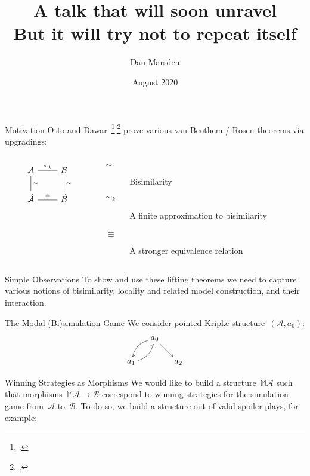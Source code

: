 \documentclass{beamer}
\title{A talk that will soon unravel\\{\small But it will try not to repeat itself}}
\author{Dan Marsden}
\date{August 2020}
\newcommand{\As}{\mathcal{A}}
\newcommand{\Bs}{\mathcal{B}}
\newcommand{\M}{\mathbb{M}}
\begin{document}
\begin{frame}
\maketitle
\end{frame}

\begin{frame}[fragile]{Motivation}
    Otto and Dawar~\footcite{Otto2004},\footcite{DawarOtto2009} prove various van Benthem / Rosen theorems via upgradings:
    \begin{columns}
    \begin{column}{0.3\textwidth}
    \begin{equation*}
    \begin{tikzcd}[arrows=-]
    \As \rar["\sim_k"] \dar["\sim"] & \Bs \dar["\sim"] \\
    \hat{\As} \rar["\dot{\equiv}"] & \hat{\Bs}
    \end{tikzcd}
    \end{equation*}
    \end{column}
    \begin{column}{0.7\textwidth}
    \begin{description}
    \item[$\sim$] Bisimilarity
    \item[$\sim_k$] A finite approximation to bisimilarity
    \item[$\dot{\equiv}$] A stronger equivalence relation
    \end{description}
    \end{column}
    \end{columns}
    \begin{block}{Simple Observations}
    To show and use these lifting theorems we need to capture various notions of bisimilarity, locality and related model construction, and their interaction.
    \end{block}
\end{frame}

\begin{frame}{The Modal (Bi)simulation Game}
    We consider pointed Kripke structure~$(\As, a_0)$:
    \begin{equation*}
        \begin{tikzpicture}
        \path node(a0) {$a_0$} +(-1,-1) node (a1) {$a_1$} +(1,-1) node(a2) {$a_2$};
        \path[->] 
        (a0) edge[bend right] (a1)
        (a1) edge[bend right] (a0)
        (a0) edge (a2);
        \end{tikzpicture}
    \end{equation*}
    \pause
    \begin{block}{Winning Strategies as Morphisms}
    We would like to build a structure~$\M \As$ such that morphisms~$\M \As \rightarrow \Bs$ correspond to winning strategies for the simulation game from~$\As$ to~$\Bs$.
    To do so, we build a structure out of valid spoiler plays, for example:
    \begin{equation*}
        [a_0 \rightarrow a_1 \rightarrow a_0 \rightarrow a_2]
    \end{equation*}
    \end{block}
\end{frame}
\end{document}
